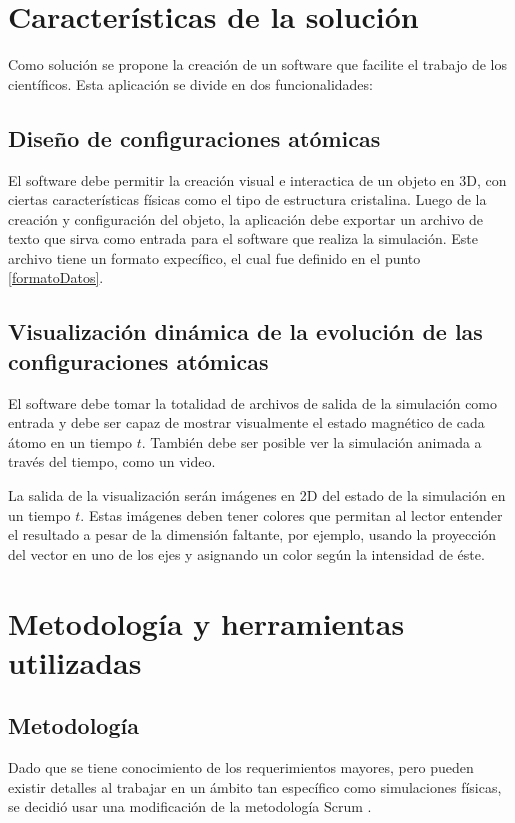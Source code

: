 \section{Características de la solución}

Como solución se propone la creación de un software que facilite el trabajo de los científicos. Esta aplicación se divide en dos funcionalidades:

\subsection{Diseño de configuraciones atómicas}

El software debe permitir la creación visual e interactica de un objeto en 3D, con ciertas características físicas como el tipo de estructura cristalina. Luego de la creación y configuración del objeto, la aplicación debe exportar un archivo de texto que sirva como entrada para el software que realiza la simulación. Este archivo tiene un formato expecífico, el cual fue definido en el punto \ref{formatoDatos}.

\subsection{Visualización dinámica de la evolución de las configuraciones atómicas}

El software debe tomar la totalidad de archivos de salida de la simulación como entrada y debe ser capaz de mostrar visualmente el estado magnético de cada átomo en un tiempo $t$. También debe ser posible ver la simulación animada a través del tiempo, como un video.

La salida de la visualización serán imágenes en 2D del estado de la simulación en un tiempo $t$. Estas imágenes deben tener colores que permitan al lector entender el resultado a pesar de la dimensión faltante, por ejemplo, usando la proyección del vector en uno de los ejes y asignando un color según la intensidad de éste.


\section{Metodolog\'ia y herramientas utilizadas}
\label{intro:metodologia}

\subsection{Metodolog\'ia}
Dado que se tiene conocimiento de los requerimientos mayores, pero pueden existir detalles al trabajar en un ámbito tan específico como simulaciones físicas, se decidió usar una modificación de la metodología Scrum \citep{SCRUM}.

